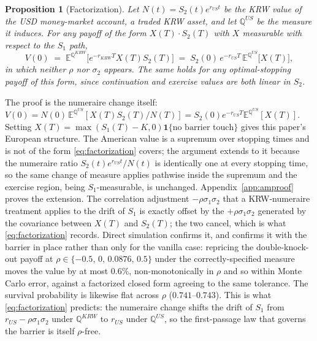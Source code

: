 \documentclass[11pt,a4paper]{article}
\newtheorem{proposition}{Proposition}
\begin{document}
\begin{proposition}[Factorization]
\label{prop:factor}
Let $N(t)=S_2(t)e^{r_{US}t}$ be the KRW value of the USD money-market account, a traded KRW asset, and let $\mathbb Q^{US}$ be the measure it induces. For any payoff of the form $X(T)\cdot S_2(T)$ with $X$ measurable with respect to the $S_1$ path,
\begin{equation}
V(0)\;=\;\mathbb E^{\mathbb Q^{KRW}}\!\big[e^{-r_{KRW}T}X(T)S_2(T)\big]\;=\;S_2(0)\,e^{-r_{US}T}\,\mathbb E^{\mathbb Q^{US}}\!\big[X(T)\big],
\label{eq:factorization}
\end{equation}
in which neither $\rho$ nor $\sigma_2$ appears. The same holds for any optimal-stopping payoff of this form, since continuation and exercise values are both linear in $S_2$.
\end{proposition}

\noindent The proof is the numeraire change itself: $V(0)=N(0)\,\mathbb E^{\mathbb Q^{US}}[X(T)S_2(T)/N(T)] = S_2(0)e^{-r_{US}T}\mathbb E^{\mathbb Q^{US}}[X(T)]$. Setting $X(T)=\max(S_1(T)-K,0)\mathbf 1\{\text{no barrier touch}\}$ gives this paper's European structure. The American value is a supremum over stopping times and is not of the form \eqref{eq:factorization} covers; the argument extends to it because the numeraire ratio $S_2(t)e^{r_{US}t}/N(t)$ is identically one at every stopping time, so the same change of measure applies pathwise inside the supremum and the exercise region, being $S_1$-measurable, is unchanged. Appendix~\ref{app:amproof} proves the extension. The correlation adjustment $-\rho\sigma_1\sigma_2$ that a KRW-numeraire treatment applies to the drift of $S_1$ is exactly offset by the $+\rho\sigma_1\sigma_2$ generated by the covariance between $X(T)$ and $S_2(T)$; the two cancel, which is what \eqref{eq:factorization} records. Direct simulation confirms it, and confirms it with the barrier in place rather than only for the vanilla case: repricing the double-knock-out payoff at $\rho\in\{-0.5,\,0,\,0.0876,\,0.5\}$ under the correctly-specified measure moves the value by at most $0.6\%$, non-monotonically in $\rho$ and so within Monte Carlo error, against a factorized closed form agreeing to the same tolerance. The survival probability is likewise flat across $\rho$ ($0.741$--$0.743$). This is what \eqref{eq:factorization} predicts: the numeraire change shifts the drift of $S_1$ from $r_{US}-\rho\sigma_1\sigma_2$ under $\mathbb Q^{KRW}$ to $r_{US}$ under $\mathbb Q^{US}$, so the first-passage law that governs the barrier is itself $\rho$-free.
\end{document}
